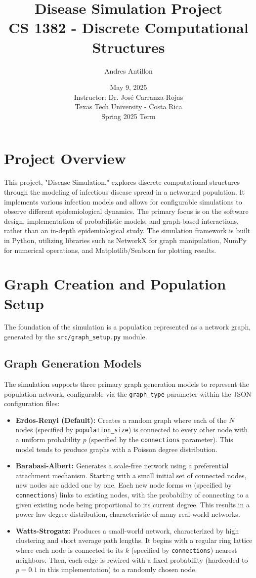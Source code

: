 \documentclass[12pt]{article}
\title{Disease Simulation Project \\ \large CS 1382 - Discrete Computational Structures}
\author{Andres Antillon}
\date{May 9, 2025 \\ \vspace{0.5em} \small Instructor: Dr. Jos\'{e} Carranza-Rojas \\ \small Texas Tech University - Costa Rica \\ \small Spring 2025 Term}
\begin{document}
\maketitle
\tableofcontents
\newpage

\section{Project Overview}
This project, "Disease Simulation," explores discrete computational structures through the modeling of infectious disease spread in a networked population. It implements various infection models and allows for configurable simulations to observe different epidemiological dynamics. The primary focus is on the software design, implementation of probabilistic models, and graph-based interactions, rather than an in-depth epidemiological study. The simulation framework is built in Python, utilizing libraries such as NetworkX for graph manipulation, NumPy for numerical operations, and Matplotlib/Seaborn for plotting results.

\section{Graph Creation and Population Setup}
The foundation of the simulation is a population represented as a network graph, generated by the \texttt{src/graph\_setup.py} module.

\subsection{Graph Generation Models}
The simulation supports three primary graph generation models to represent the population network, configurable via the \texttt{graph\_type} parameter within the JSON configuration files:
\begin{itemize}
    \item \textbf{Erdos-Renyi (Default):} Creates a random graph where each of the $N$ nodes (specified by \texttt{population\_size}) is connected to every other node with a uniform probability $p$ (specified by the \texttt{connections} parameter). This model tends to produce graphs with a Poisson degree distribution.
    \item \textbf{Barabasi-Albert:} Generates a scale-free network using a preferential attachment mechanism. Starting with a small initial set of connected nodes, new nodes are added one by one. Each new node forms $m$ (specified by \texttt{connections}) links to existing nodes, with the probability of connecting to a given existing node being proportional to its current degree. This results in a power-law degree distribution, characteristic of many real-world networks.
    \item \textbf{Watts-Strogatz:} Produces a small-world network, characterized by high clustering and short average path lengths. It begins with a regular ring lattice where each node is connected to its $k$ (specified by \texttt{connections}) nearest neighbors. Then, each edge is rewired with a fixed probability (hardcoded to $p=0.1$ in this implementation) to a randomly chosen node.
\end{itemize}
\end{document}
